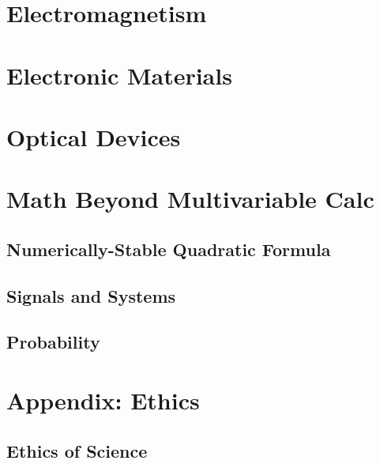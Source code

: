\documentclass[12pt]{article}
\begin{document}
\section{Electromagnetism}

\section{Electronic Materials}

\section{Optical Devices}

\section{Math Beyond Multivariable Calc}
\subsection{Numerically-Stable Quadratic Formula}
\subsection{Signals and Systems}
\subsection{Probability}

\section{Appendix: Ethics}
\subsection{Ethics of Science}
\end{document}
